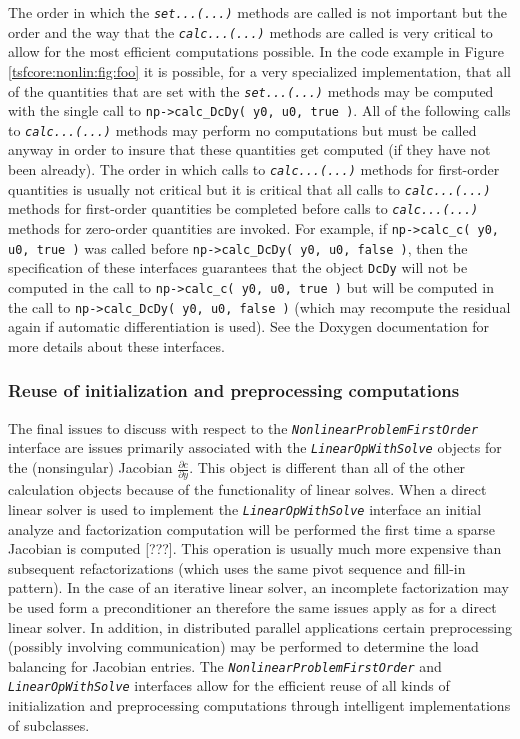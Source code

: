 %
The order in which the \texttt{\textit{set...(...)}} methods are
called is not important but the order and the way that the
\texttt{\textit{calc...(...)}} methods are called is very critical to
allow for the most efficient computations possible.  In the code
example in Figure \ref{tsfcore:nonlin:fig:foo} it is possible, for a
very specialized implementation, that all of the quantities that are
set with the \texttt{\textit{set...(...)}} methods may be computed
with the single call to \texttt{np->calc\_DcDy( y0, u0, true )}.  All
of the following calls to \texttt{\textit{calc...(...)}} methods may
perform no computations but must be called anyway in order to insure
that these quantities get computed (if they have not been already).
The order in which calls to \texttt{\textit{calc...(...)}} methods for
first-order quantities is usually not critical but it is critical that
all calls to \texttt{\textit{calc...(...)}}  methods for first-order
quantities be completed before calls to \texttt{\textit{calc...(...)}}
methods for zero-order quantities are invoked.  For example, if
\texttt{np->calc\_c( y0, u0, true )} was called before
\texttt{np->calc\_DcDy( y0, u0, false )}, then the specification of these
interfaces guarantees that the object \texttt{DcDy} will not be
computed in the call to \texttt{np->calc\_c( y0, u0, true )} but will be
computed in the call to \texttt{np->calc\_DcDy( y0, u0, false )} (which
may recompute the residual again if automatic differentiation is
used).  See the Doxygen documentation for more details about these
interfaces.

%
\subsubsection{Reuse of initialization and preprocessing computations}
%

The final issues to discuss with respect to the
\texttt{\textit{Nonlinear\-Problem\-First\-Order}} interface are issues
primarily associated with the
\texttt{\textit{Linear\-Op\-With\-Solve}} objects for the (nonsingular)
Jacobian $\frac{\partial c}{\partial y}$.  This object is different
than all of the other calculation objects because of the functionality
of linear solves.  When a direct linear solver is used to implement
the \texttt{\textit{Linear\-Op\-With\-Solve}} interface an initial
analyze and factorization computation will be performed the first time
a sparse Jacobian is computed [???].  This operation is usually much
more expensive than subsequent refactorizations (which uses the same
pivot sequence and fill-in pattern).  In the case of an iterative
linear solver, an incomplete factorization may be used form a
preconditioner an therefore the same issues apply as for a direct
linear solver.  In addition, in distributed parallel applications
certain preprocessing (possibly involving communication) may be
performed to determine the load balancing for Jacobian entries.  The
\texttt{\textit{Nonlinear\-Problem\-First\-Order}} and
\texttt{\textit{Linear\-Op\-With\-Solve}} interfaces allow
for the efficient reuse of all kinds of initialization and
preprocessing computations through intelligent implementations of
subclasses.

